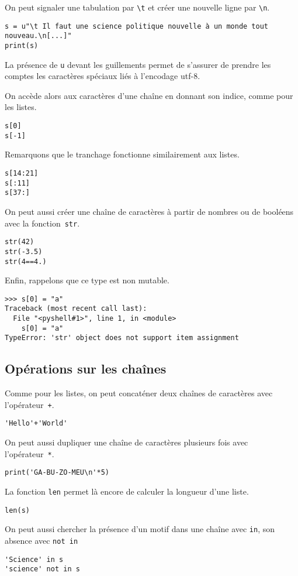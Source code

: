 On peut signaler une tabulation par \texttt{\textbackslash t} et créer une nouvelle ligne par \texttt{\textbackslash n}.

\begin{lstlisting}
s = u"\t Il faut une science politique nouvelle à un monde tout nouveau.\n[...]"
print(s)
\end{lstlisting}


\begin{remarque}
La présence de \texttt{u} devant les guillements permet de s'assurer de prendre les comptes les caractères spéciaux liés à l'encodage utf-8.
\end{remarque}

On accède alors aux caractères d'une chaîne en donnant son indice, comme pour les listes. 
\begin{lstlisting}
s[0]
s[-1]
\end{lstlisting}
Remarquons que le tranchage fonctionne similairement aux listes.
\begin{lstlisting}
s[14:21]
s[:11]
s[37:]
\end{lstlisting}
On peut aussi créer une chaîne de caractères à partir de nombres ou de booléens avec la fonction~\texttt{str}.
\begin{lstlisting}
str(42)
str(-3.5)
str(4==4.)
\end{lstlisting}

Enfin, rappelons que ce type est non mutable.
\begin{lstlisting}
>>> s[0] = "a"
Traceback (most recent call last):
  File "<pyshell#1>", line 1, in <module>
    s[0] = "a"
TypeError: 'str' object does not support item assignment
\end{lstlisting}

\subsection{Opérations sur les chaînes}

Comme pour les listes, on peut concaténer deux chaînes de caractères avec l'opérateur~\texttt{+}.
\begin{lstlisting}
'Hello'+'World'
\end{lstlisting}
On peut aussi dupliquer une chaîne de caractères plusieurs fois avec l'opérateur~\texttt{*}.
\begin{lstlisting}
print('GA-BU-ZO-MEU\n'*5)
\end{lstlisting}
La fonction \texttt{len} permet là encore de calculer la longueur d'une liste.
\begin{lstlisting}
len(s)
\end{lstlisting}
On peut aussi chercher la présence d'un motif dans une chaîne avec \texttt{in}, son absence avec \texttt{not in}
\begin{lstlisting}
'Science' in s
'science' not in s
\end{lstlisting}



